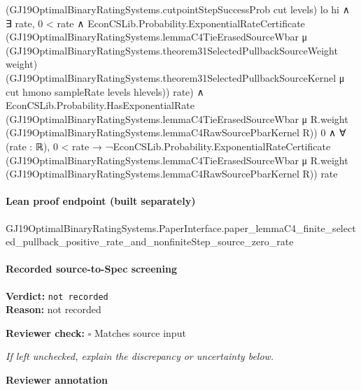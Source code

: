 \documentclass[10pt]{article}
\newcommand{\reviewerbox}{%
  \par\noindent\fbox{\parbox{0.96\linewidth}{\rule{0pt}{0.38in}}}\par
}
\newcommand{\reviewmatch}[1]{%
  \par\noindent\textbf{Reviewer check:} $\square$\; #1\par
  \noindent\emph{If left unchecked, explain the discrepancy or uncertainty below.}\par
}
\begin{document}
\begin{ReviewVerbatim}
                                  (GJ19OptimalBinaryRatingSystems.cutpointStepSuccessProb cut levels) lo hi ∧
                                ∃ rate,
                                  0 < rate ∧
                                    EconCSLib.Probability.ExponentialRateCertificate
                                      (GJ19OptimalBinaryRatingSystems.lemmaC4TieErasedSourceWbar μ
                                        (GJ19OptimalBinaryRatingSystems.theorem31SelectedPullbackSourceWeight weight)
                                        (GJ19OptimalBinaryRatingSystems.theorem31SelectedPullbackSourceKernel μ cut
                                          hmono sampleRate levels hlevels))
                                      rate) ∧
                              EconCSLib.Probability.HasExponentialRate
                                  (GJ19OptimalBinaryRatingSystems.lemmaC4TieErasedSourceWbar μ R.weight
                                    (GJ19OptimalBinaryRatingSystems.lemmaC4RawSourcePbarKernel R))
                                  0 ∧
                                ∀ (rate : ℝ),
                                  0 < rate →
                                    ¬EconCSLib.Probability.ExponentialRateCertificate
                                        (GJ19OptimalBinaryRatingSystems.lemmaC4TieErasedSourceWbar μ R.weight
                                          (GJ19OptimalBinaryRatingSystems.lemmaC4RawSourcePbarKernel R))
                                        rate
\end{ReviewVerbatim}

\paragraph{Lean proof endpoint (built separately)}\begin{ReviewVerbatim}
GJ19OptimalBinaryRatingSystems.PaperInterface.paper_lemmaC4_finite_selected_pullback_positive_rate_and_nonfiniteStep_source_zero_rate
\end{ReviewVerbatim}

\paragraph{Recorded source-to-Spec screening}
\textbf{Verdict:} \texttt{not recorded}
\\
\textbf{Reason:} not recorded
\reviewmatch{Matches source input}
\noindent\textbf{Reviewer annotation}\par
\reviewerbox
\clearpage
\hypertarget{source-claim-15e577a1127ae1d6}{}
\end{document}
